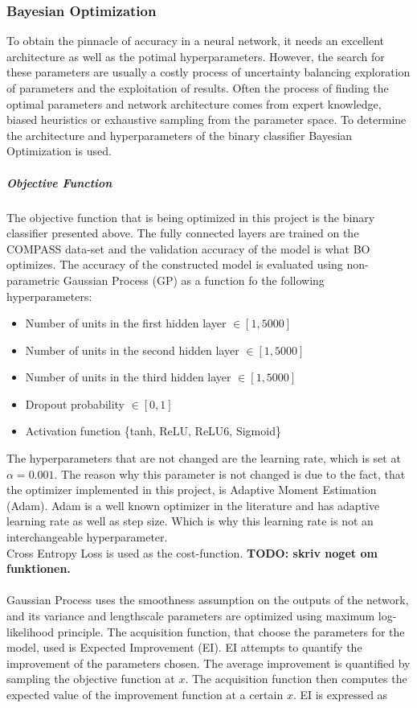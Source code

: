 \documentclass[11pt, fleqn, titlepage]{article}
\begin{document}
	
	\subsubsection{Bayesian Optimization}
	
	To obtain the pinnacle of accuracy in a neural network, it needs an excellent architecture as well as the potimal hyperparameters. However, the search for these parameters are usually a costly process of uncertainty balancing exploration of parameters and the exploitation of results. Often the process of finding the optimal parameters and network architecture comes from expert knowledge, biased heuristics or exhaustive sampling from the parameter space. To determine the architecture and hyperparameters of the binary classifier Bayesian Optimization is used. 
	\subparagraph*{Objective Function}
	The objective function that is being optimized in this project is the binary classifier presented above. The fully connected layers are trained on the COMPASS data-set and the validation accuracy of the model is what BO optimizes. The accuracy of the constructed model is evaluated using non-parametric Gaussian Process (GP) as a function fo the following hyperparameters:
	\begin{itemize}
		\item Number of units in the first hidden layer \(\in [1, 5000]\) 
		\item Number of units in the second hidden layer \(\in [1, 5000]\) 
		\item Number of units in the third hidden layer \(\in [1, 5000]\)
		\item Dropout probability \(\in [0,1]\)
		\item Activation function \{tanh, ReLU, ReLU6, Sigmoid\}
	\end{itemize}
	The hyperparameters that are not changed are the learning rate, which is set at $ \alpha = 0.001 $. The reason why this parameter is not changed is due to the fact, that the optimizer implemented in this project, is Adaptive Moment Estimation (Adam). Adam is a well known optimizer in the literature and has adaptive learning rate as well as step size. Which is why this learning rate is not an interchangeable hyperparameter. \\ Cross Entropy Loss is used as the cost-function. \textbf{TODO: skriv noget om funktionen. }
	\\\\
	Gaussian Process uses the smoothness assumption on the outputs of the network, and its variance and lengthscale parameters are optimized using maximum log-likelihood principle. \cite{aktiv_gp} The acquisition function, that choose the parameters for the model, used is Expected Improvement (EI). EI attempts to quantify the improvement of the parameters chosen. The average improvement is quantified by sampling the objective function at $x$. The acquisition function then computes the expected value of the improvement function at a certain $x$. EI is expressed as 
\end{document}

